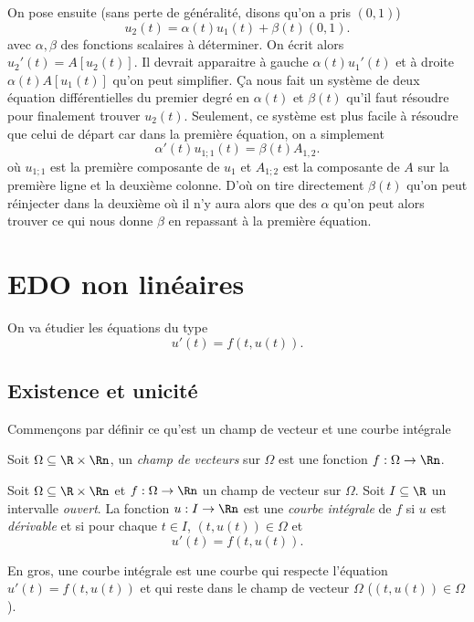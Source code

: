 On pose ensuite (sans perte de généralité, disons qu'on a pris $(0,1)$)
\[ u_2(t) = \alpha(t)u_1(t) + \beta(t)(0,1). \]
avec $\alpha,\beta$ des fonctions scalaires à déterminer.
On écrit alors $u_2'(t) = A[u_2(t)]$.
Il devrait apparaitre à gauche $\alpha(t) u_1'(t)$ et à droite
$\alpha(t) A[u_1(t)]$ qu'on peut simplifier.
Ça nous fait un système de deux équation différentielles du premier degré
en $\alpha(t)$ et $\beta(t)$ qu'il faut résoudre pour finalement trouver
$u_2(t)$.
Seulement, ce système est plus facile à résoudre que celui de départ
car dans la première équation, on a simplement
\[ \alpha'(t)u_{1;1}(t) = \beta(t)A_{1,2}. \]
où $u_{1;1}$ est la première composante de $u_1$ et $A_{1;2}$ est
la composante de $A$ sur la première ligne et la deuxième colonne.
D'où on tire directement $\beta(t)$ qu'on peut réinjecter dans la deuxième
où il n'y aura alors que des $\alpha$ qu'on peut alors trouver ce qui nous
donne $\beta$ en repassant à la première équation.

\section{EDO non linéaires}
On va étudier les équations du type
\[ u'(t) = f(t, u(t)). \]

\subsection{Existence et unicité}
Commençons par définir ce qu'est un champ de vecteur et
une courbe intégrale
\begin{mydef}
  Soit $\Omega \subseteq \R \times \Rn$,
  un \emph{champ de vecteurs} sur $\Omega$ est une fonction
  $f:\Omega \to \Rn$.
\end{mydef}
\begin{mydef}
  Soit $\Omega \subseteq \R \times \Rn$ et $f:\Omega\to\Rn$
  un champ de vecteur sur $\Omega$.
  Soit $I \subseteq \R$ un intervalle \emph{ouvert}.
  La fonction $u:I\to\Rn$ est une \emph{courbe intégrale} de $f$ si $u$
  est \emph{dérivable} et si pour chaque $t\in I$, $(t, u(t)) \in \Omega$ et
  \[ u'(t) = f(t, u(t)). \]
\end{mydef}
En gros, une courbe intégrale est une courbe qui respecte l'équation
$u'(t) = f(t, u(t))$ et qui reste dans le champ de vecteur $\Omega$
($(t, u(t)) \in \Omega$).

